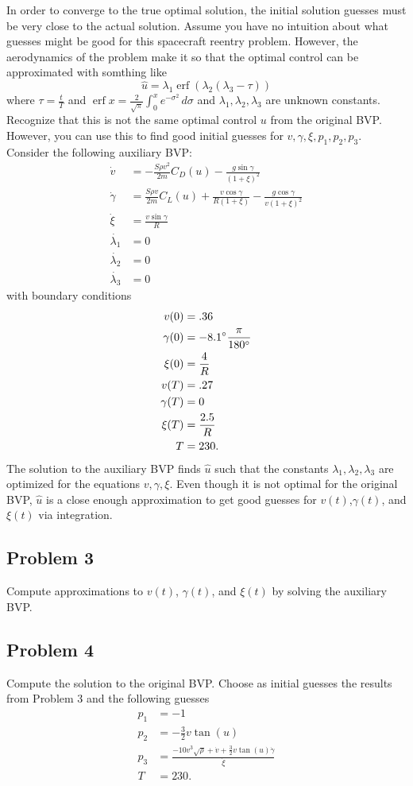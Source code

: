 \documentclass{article}
\DeclareMathOperator\erf{erf}
\begin{document}
In order to converge to the true optimal solution, the initial solution guesses must be very close to the actual solution. Assume you have no intuition about what guesses might be good for this spacecraft reentry problem. However, the aerodynamics of the problem make it so that the optimal control can be approximated with somthing like
\[
\hat{u} = \lambda_1 \erf(\lambda_2(\lambda_3 - \tau))
\]
where $\tau = \frac{t}{T}$ and $\erf{x} = \frac{2}{\sqrt{\pi}}\int_0^xe^{-\sigma^2}\,d\sigma$ and $\lambda_1, \lambda_2, \lambda_3$ are unknown constants.
Recognize that this is not the same optimal control $u$ from the original BVP. However, you can use this to find good initial guesses for $v,\gamma,\xi,p_1,p_2,p_3$. Consider the following auxiliary BVP:
\begin{align*}
    \dot{v} &= -\frac{S \rho v^2}{2m}C_D(u) - \frac{g \sin{\gamma}}{(1 + \xi)^2} \\
    \dot{\gamma} &= \frac{S \rho v}{2m}C_L(u) + \frac{v\cos{\gamma}}{R(1 + \xi)} - \frac{g\cos{\gamma}}{v(1+\xi)^2} \\
    \dot{\xi} &= \frac{v\sin{\gamma}}{R} \\
    \dot{\lambda_1} &= 0 \\
    \dot{\lambda_2} &= 0 \\
    \dot{\lambda_3} &= 0
\end{align*}
with boundary conditions
\begin{align*}
    v(0) &= .36 \\
    \gamma{(0)} &= -8.1\degree \frac{\pi}{180\degree} \\
    \xi(0) &= \frac{4}{R} \\
    v(T) &= .27 \\
    \gamma(T) &= 0 \\
    \xi(T) &= \frac{2.5}{R} \\
    T &= 230.
\end{align*}
The solution to the auxiliary BVP finds $\hat{u}$ such that the constants $\lambda_1,\lambda_2,\lambda_3$ are optimized for the equations $v,\gamma,\xi$. Even though it is not optimal for the original BVP, $\hat{u}$ is a close enough approximation to get good guesses for $v(t)$,$\gamma(t)$, and $\xi(t)$ via integration.

\subsection*{Problem 3}
Compute approximations to $v(t)$, $\gamma(t)$, and $\xi(t)$ by solving the auxiliary BVP.

\subsection*{Problem 4}
Compute the solution to the original BVP. Choose as initial guesses the results from Problem 3 and the following guesses
\begin{align*}
    p_1 &= -1 \\
    p_2 &= -\frac{3}{2}v\tan(u) \\
    p_3 &= \frac{-10v^3\sqrt{\rho}+\dot{v} + \frac{3}{2}v\tan(u)\dot{\gamma}}{\dot{\xi}} \\
    T &= 230.
\end{align*}
\end{document}
